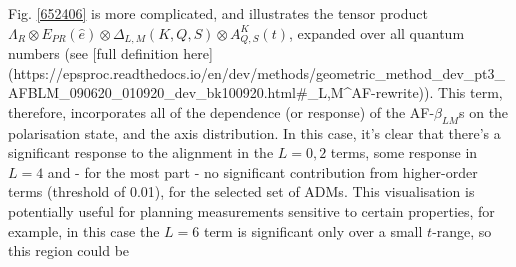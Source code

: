 Fig. \ref{652406} is more complicated, and illustrates the tensor product $\Lambda_{R}\otimes E_{PR}(\hat{e})\otimes \Delta_{L,M}(K,Q,S)\otimes A^{K}_{Q,S}(t)$, expanded over all quantum numbers (see [full definition here](https://epsproc.readthedocs.io/en/dev/methods/geometric_method_dev_pt3_AFBLM_090620_010920_dev_bk100920.html#\beta_{L,M}^{AF}-rewrite)). This term, therefore, incorporates all of the dependence (or response) of the AF-$\beta_{LM}$s on the polarisation state, and the axis distribution. In this case, it's clear that there's a significant response to the alignment in the $L=0,2$ terms, some response in $L=4$ and - for the most part - no significant contribution from higher-order terms (threshold of 0.01), for the selected set of ADMs. This visualisation is potentially useful for planning measurements sensitive to certain properties, for example, in this case the $L=6$ term is significant only over a small $t$-range, so this region could be
